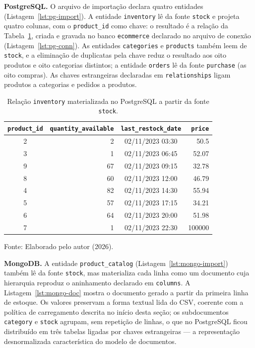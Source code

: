 \textbf{PostgreSQL.} O arquivo de importação declara quatro entidades
(Listagem~\ref{lst:pg-import}). A entidade \texttt{inventory} lê da fonte \texttt{stock} e
projeta quatro colunas, com o \texttt{product\_id} como chave: o resultado é a relação da
Tabela~\ref{tab:pg-inventory}, criada e gravada no banco \texttt{ecommerce} declarado
no arquivo de conexão (Listagem~\ref{lst:pg-conn}). As entidades \texttt{categories} e
\texttt{products} também leem de \texttt{stock}, e a eliminação de duplicatas pela chave
reduz o resultado aos oito produtos e oito categorias distintos; a entidade
\texttt{orders} lê da fonte \texttt{purchase} (as oito compras). As chaves estrangeiras
declaradas em \texttt{relationships} ligam produtos a categorias e pedidos a produtos.

\begin{table}[H]
  \caption{Relação \texttt{inventory} materializada no PostgreSQL a partir da fonte \texttt{stock}.}
  \label{tab:pg-inventory}
  \centering
  \begin{tabular}{c r c r}
    \toprule
    \texttt{product\_id} & \texttt{quantity\_available} & \texttt{last\_restock\_date} & \texttt{price} \\
    \midrule
    2 &  2 & 02/11/2023 03:30 & 50.5 \\
    3 &  1 & 02/11/2023 06:45 & 52.07 \\
    9 & 67 & 02/11/2023 09:15 & 32.78 \\
    8 & 60 & 02/11/2023 12:00 & 46.79 \\
    4 & 82 & 02/11/2023 14:30 & 55.94 \\
    5 & 57 & 02/11/2023 17:15 & 34.21 \\
    6 & 64 & 02/11/2023 20:00 & 51.98 \\
    7 &  1 & 02/11/2023 22:30 & 100000 \\
    \bottomrule
  \end{tabular}
  \par\vspace{4pt}
  {\footnotesize Fonte: Elaborado pelo autor (2026).}
\end{table}

\textbf{MongoDB.} A entidade \texttt{product\_catalog}
(Listagem~\ref{lst:mongo-import}) também lê da fonte \texttt{stock}, mas materializa cada
linha como um documento cuja hierarquia reproduz o aninhamento declarado em
\texttt{columns}. A Listagem~\ref{lst:mongo-doc} mostra o documento gerado a partir da
primeira linha de estoque. Os valores preservam a forma textual lida do CSV, coerente com
a política de carregamento descrita no início desta seção; os subdocumentos
\texttt{category} e \texttt{stock} agrupam, sem repetição de linhas, o que no PostgreSQL
ficou distribuído em três tabelas ligadas por chaves estrangeiras --- a representação
desnormalizada característica do modelo de documentos.

